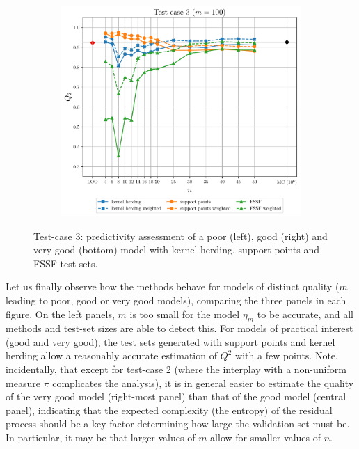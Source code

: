 \begin{figure}
\begin{subfigure}[b]{0.49\linewidth}
  \end{subfigure}
  \\
  \centering
  \begin{subfigure}[b]{0.49\linewidth}
    \centering
    \includegraphics[width=\linewidth]{./part2/figures/SIS/gsobol_learnsize_100.pdf}
  \end{subfigure}
  \caption{Test-case 3: predictivity assessment of a poor (left), good (right) and very good (bottom) model with kernel herding, support points and FSSF test sets.}
  \label{fig:gsobol_benchmark}
\end{figure}

Let us finally observe how the methods behave for models of distinct quality ($m$ leading to poor, good or very good models), comparing the three panels in each figure. 
On the left panels, $m$ is too small for the model $\eta_m$ to be accurate, and all methods and test-set sizes are able to detect this. 
For models of practical interest (good and very good), the test sets generated with support points and kernel herding allow a reasonably accurate estimation of $Q^2$ with a few points. 
Note, incidentally, that except for test-case 2 (where the interplay with a non-uniform measure $\pi$ complicates the analysis), it is in general easier to estimate the quality of the very good model (right-most panel) than that of the good model (central panel), indicating that the expected complexity (the entropy) of the residual process should be a key factor determining how large the validation set must be. 
In particular, it may be that larger values of $m$ allow for smaller values of $n$.





